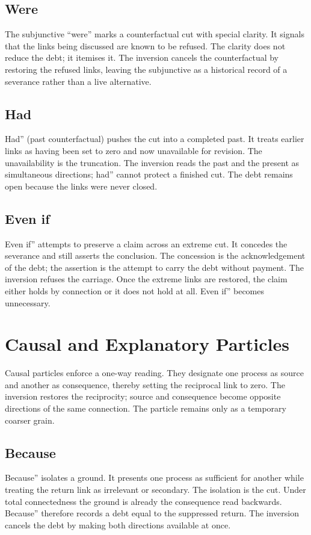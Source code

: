 \documentclass[11pt,a4paper]{article}
\begin{document}
\subsection{Were} The subjunctive ``were'' marks a counterfactual cut with special clarity. It signals that the links being discussed are known to be refused. The clarity does not reduce the debt; it itemises it. The inversion cancels the counterfactual by restoring the refused links, leaving the subjunctive as a historical record of a severance rather than a live alternative.

\subsection{Had} Had'' (past counterfactual) pushes the cut into a completed past. It treats earlier links as having been set to zero and now unavailable for revision. The unavailability is the truncation. The inversion reads the past and the present as simultaneous directions; had'' cannot protect a finished cut. The debt remains open because the links were never closed.

\subsection{Even if} Even if'' attempts to preserve a claim across an extreme cut. It concedes the severance and still asserts the conclusion. The concession is the acknowledgement of the debt; the assertion is the attempt to carry the debt without payment. The inversion refuses the carriage. Once the extreme links are restored, the claim either holds by connection or it does not hold at all. Even if'' becomes unnecessary.

\section{Causal and Explanatory Particles}

Causal particles enforce a one-way reading. They designate one process as source and another as consequence, thereby setting the reciprocal link to zero. The inversion restores the reciprocity; source and consequence become opposite directions of the same connection. The particle remains only as a temporary coarser grain.

\subsection{Because} Because'' isolates a ground. It presents one process as sufficient for another while treating the return link as irrelevant or secondary. The isolation is the cut. Under total connectedness the ground is already the consequence read backwards. Because'' therefore records a debt equal to the suppressed return. The inversion cancels the debt by making both directions available at once.
\end{document}
